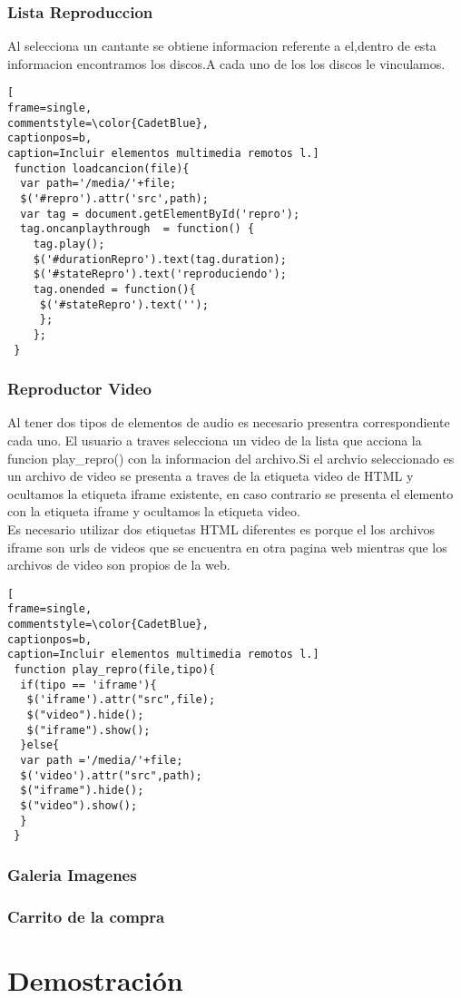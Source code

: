 \subsubsection*{Lista Reproduccion}
Al selecciona un cantante se obtiene informacion referente a el,dentro de esta informacion encontramos los discos.A cada uno de los los discos le vinculamos.
\begin{lstlisting}[
frame=single,
commentstyle=\color{CadetBlue},
captionpos=b,
caption=Incluir elementos multimedia remotos l.]
 function loadcancion(file){
  var path='/media/'+file;
  $('#repro').attr('src',path);
  var tag = document.getElementById('repro');
  tag.oncanplaythrough  = function() {
    tag.play();
    $('#durationRepro').text(tag.duration);
    $('#stateRepro').text('reproduciendo');
    tag.onended = function(){
     $('#stateRepro').text('');
     };
    };
 }
\end{lstlisting}
\subsubsection*{Reproductor Video}
Al tener dos tipos de elementos de audio es necesario presentra correspondiente cada uno. El usuario a traves selecciona un video de la lista que acciona la funcion play\_repro() con la informacion del archivo.Si el archvio seleccionado es un archivo de video se presenta a traves de la etiqueta video de HTML y ocultamos la etiqueta iframe existente, en caso contrario se presenta el elemento con la etiqueta iframe y ocultamos la etiqueta video.
\\Es necesario utilizar dos etiquetas HTML diferentes es porque el los archivos iframe son urls de videos que se encuentra en otra pagina web mientras que los archivos de video son propios de la web.
\begin{lstlisting}[
frame=single,
commentstyle=\color{CadetBlue},
captionpos=b,
caption=Incluir elementos multimedia remotos l.]
 function play_repro(file,tipo){
  if(tipo == 'iframe'){
   $('iframe').attr("src",file);
   $("video").hide();
   $("iframe").show();
  }else{
  var path ='/media/'+file;
  $('video').attr("src",path);
  $("iframe").hide();
  $("video").show();
  }
 }
\end{lstlisting}
\subsubsection*{Galeria Imagenes}
\subsubsection*{Carrito de la compra}
\section{Demostración}
